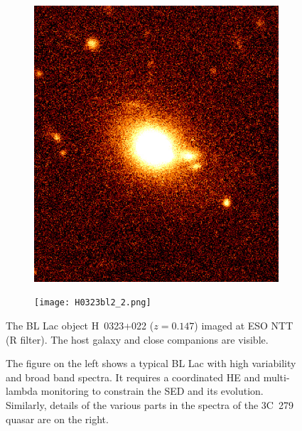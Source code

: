 \documentclass[10pt,a4paper,english]{article}
\begin{document}
\begin{figure}[!ht]
    \centering
    \begin{subfigure}[t]{.495\textwidth}
          \includegraphics[width=\textwidth]{H0323bl2.jpg}
    \end{subfigure}
    \begin{subfigure}[t]{.495\textwidth}
          \texttt{[image: H0323bl2\_2.png]}
    \end{subfigure}
    \caption{
        The BL Lac object H~0323+022 ($z=0.147$) imaged at ESO NTT (R
        filter). The host galaxy and close companions are visible.
    }
\end{figure}

\begin{figure}[!ht]
    \noindent
    \begin{subfigure}[t]{.495\textwidth}
    \end{subfigure}%
    \hfill
    \begin{subfigure}[t]{.495\textwidth}
    \end{subfigure}
    \caption{
        The figure on the left shows a typical BL Lac with high variability and
        broad band spectra. It requires a coordinated HE and multi-lambda
        monitoring to constrain the SED and its evolution. Similarly, details
        of the various parts in the spectra of the 3C~279 quasar are on the
        right.
    }
\end{figure}
\end{document}
